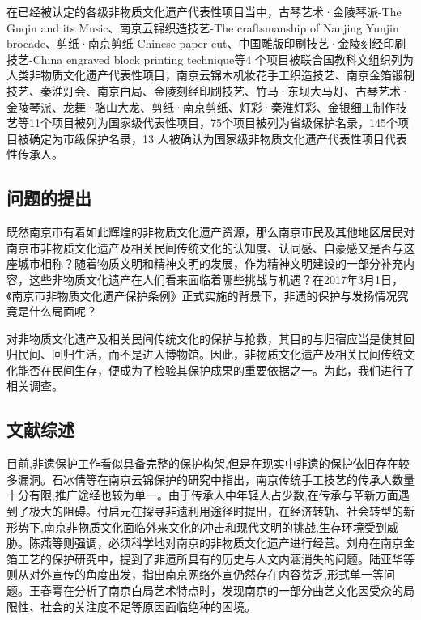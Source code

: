 \documentclass[12pt]{article}%
\begin{document}





在已经被认定的各级非物质文化遗产代表性项目当中，古琴艺术·金陵琴派-The Guqin and its Music、南京云锦织造技艺-The craftsmanship of Nanjing Yunjin brocade、剪纸·南京剪纸-Chinese paper-cut、中国雕版印刷技艺·金陵刻经印刷技艺-China engraved block printing technique等4 个项目被联合国教科文组织列为人类非物质文化遗产代表性项目，南京云锦木机妆花手工织造技艺、南京金箔锻制技艺、秦淮灯会、南京白局、金陵刻经印刷技艺、竹马·东坝大马灯、古琴艺术·金陵琴派、龙舞·骆山大龙、剪纸·南京剪纸、灯彩·秦淮灯彩、金银细工制作技艺等11个项目被列为国家级代表性项目，75个项目被列为省级保护名录，145个项目被确定为市级保护名录，13 人被确认为国家级非物质文化遗产代表性项目代表性传承人。
\subsection{问题的提出}

既然南京市有着如此辉煌的非物质文化遗产资源，那么南京市民及其他地区居民对南京市非物质文化遗产及相关民间传统文化的认知度、认同感、自豪感又是否与这座城市相称？随着物质文明和精神文明的发展，作为精神文明建设的一部分补充内容，这些非物质文化遗产在人们看来面临着哪些挑战与机遇？在2017年3月1日，《南京市非物质文化遗产保护条例》正式实施的背景下，非遗的保护与发扬情况究竟是什么局面呢？

对非物质文化遗产及相关民间传统文化的保护与抢救，其目的与归宿应当是使其回归民间、回归生活，而不是进入博物馆。因此，非物质文化遗产及相关民间传统文化能否在民间生存，便成为了检验其保护成果的重要依据之一。为此，我们进行了相关调查。

\subsection{文献综述}

目前,非遗保护工作看似具备完整的保护构架,但是在现实中非遗的保护依旧存在较多漏洞。石冰倩等在南京云锦保护的研究中指出，南京传统手工技艺的传承人数量十分有限,推广途经也较为单一。由于传承人中年轻人占少数,在传承与革新方面遇到了极大的阻碍。付启元在探寻非遗利用途径时提出，在经济转轨、社会转型的新形势下,南京非物质文化面临外来文化的冲击和现代文明的挑战,生存环境受到威胁。陈燕等则强调，必须科学地对南京的非物质文化遗产进行经营。刘舟在南京金箔工艺的保护研究中，提到了非遗所具有的历史与人文内涵消失的问题。陆亚华等则从对外宣传的角度出发，指出南京网络外宣仍然存在内容贫乏,形式单一等问题。王春雩在分析了南京白局艺术特点时，发现南京的一部分曲艺文化因受众的局限性、社会的关注度不足等原因面临绝种的困境。
\end{document}
